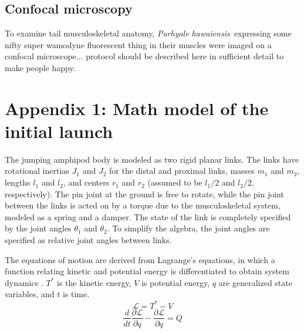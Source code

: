 \documentclass{article}
\newcommand{\Genus}[1]{\emph{#1}}
\newcommand{\Parhyalehawaiensis}{\Genus{Parhyale hawaiensis}}
\begin{document}
\subsection*{Confocal microscopy}
	To examine tail musculoskeletal anatomy, \Parhyalehawaiensis~expressing some nifty super wamodyne fluorescent thing in their muscles were imaged on a confocal microscope... protocol should be described here in sufficient detail to make people happy.








\section*{Appendix 1: Math model of the initial launch}
\label{app:1}
	The jumping amphipod body is modeled as two rigid planar links.  The links have rotational inertias $J_1$ and $J_2$ for the distal and proximal links, masses $m_1$ and $m_2$, lengths $l_1$ and $l_2$, and centers $r_1$ and $r_2$ (assumed to be $l_1/2$ and $l_2/2$, respectively).  The pin joint at the ground is free to rotate, while the pin joint between the links is acted on by a torque due to the musculoskeletal system, modeled as a spring and a damper.  The state of the link is completely specified by the joint angles $\theta_1$ and $\theta_2$.  To simplify the algebra, the joint angles are specified as relative joint angles between links.  

	The equations of motion are derived from Lagrange's equations, in which a function relating kinetic and potential energy is differentiated to obtain system dynamics \citep{Baruh:2007}.  $T^*$ is the kinetic energy, $V$ is potential energy, $q$ are generalized state variables, and $t$ is time. 
\begin{equation}
\mathcal{L} = T^* - V
\end{equation}
\begin{equation}
\frac{d}{dt}\frac{\partial \mathcal{L}}{\partial \dot{q}}
-
\frac{\partial \mathcal{L}}{\partial q}
=
Q
\end{equation}
\end{document}
